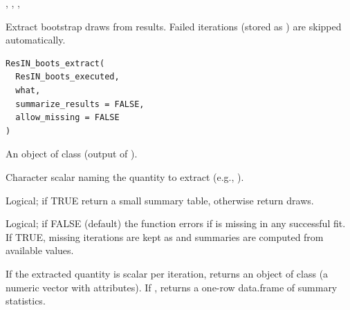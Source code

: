 \documentclass[a4paper]{book}
\begin{document}
%
\begin{SeeAlso}
, ,
, 
\end{SeeAlso}
%
\begin{Description}
Extract bootstrap draws from  results. Failed iterations
(stored as ) are skipped automatically.
\end{Description}
%
\begin{Usage}
\begin{verbatim}
ResIN_boots_extract(
  ResIN_boots_executed,
  what,
  summarize_results = FALSE,
  allow_missing = FALSE
)
\end{verbatim}
\end{Usage}
%
\begin{Arguments}
\begin{ldescription}
\item[\code{ResIN\_boots\_executed}] An object of class  (output of ).

\item[\code{what}] Character scalar naming the quantity to extract (e.g., ).

\item[\code{summarize\_results}] Logical; if TRUE return a small summary table, otherwise return draws.

\item[\code{allow\_missing}] Logical; if FALSE (default) the function errors if  is missing in any successful fit.
If TRUE, missing iterations are kept as  and summaries are computed from available values.
\end{ldescription}
\end{Arguments}
%
\begin{Value}
If the extracted quantity is scalar per iteration, returns an object of class
 (a numeric vector with attributes). If ,
returns a one-row data.frame of summary statistics.
\end{Value}
%
\end{document}
